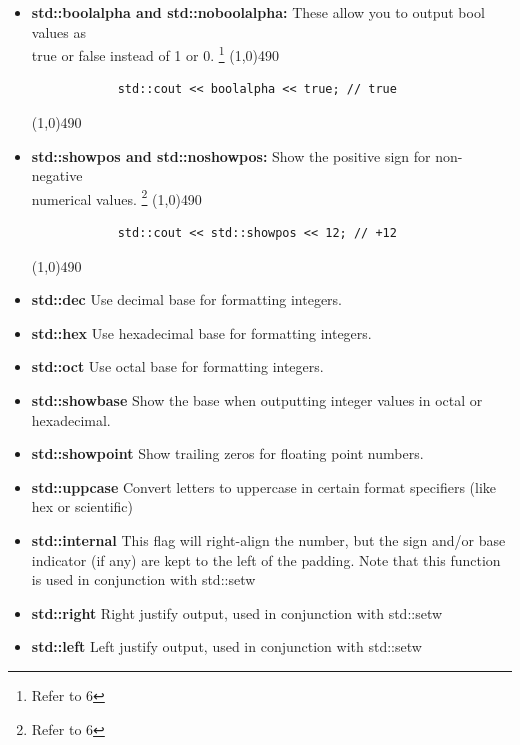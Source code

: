 \documentclass{report}
\begin{document}
\begin{itemize}
            \line(1,0){490}
        \item \textbf{std::boolalpha and std::noboolalpha:} These allow you to output bool values as \\ true or false instead of 1 or 0. \footnote{Refer to 6}
            \smallbreak
            \line(1,0){490}
            \begin{verbatim}
            std::cout << boolalpha << true; // true
            \end{verbatim}
            \line(1,0){490}
        \item \textbf{std::showpos and std::noshowpos:} Show the positive sign for non-negative \\ numerical values. \footnote{Refer to 6}
            \smallbreak
            \line(1,0){490}
            \begin{verbatim}
            std::cout << std::showpos << 12; // +12
            \end{verbatim}
            \line(1,0){490}
        \item \textbf{std::dec} Use decimal base for formatting integers.
        \item \textbf{std::hex} Use hexadecimal base for formatting integers.
        \item \textbf{std::oct} Use octal base for formatting integers.
        \item \textbf{std::showbase}  Show the base when outputting integer values in octal or hexadecimal.
        \item \textbf{std::showpoint} Show trailing zeros for floating point numbers.
        \item \textbf{std::uppcase} Convert letters to uppercase in certain format specifiers (like hex or scientific)
        \item \textbf{std::internal} This flag will right-align the number, but the sign and/or base indicator (if any) are kept to the left of the padding. Note that this function is used in conjunction with std::setw
        \item \textbf{std::right} Right justify output, used in conjunction with std::setw
        \item \textbf{std::left} Left justify output, used in conjunction with std::setw
    \end{itemize}
\end{document}
